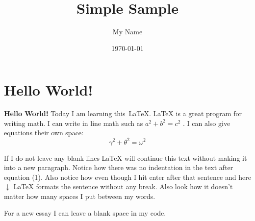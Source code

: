 \documentclass{article} %
\title{Simple Sample} %
\author{My Name} %
\date{\today} %
\begin{document}
\maketitle %

\section{Hello World!} %

\textbf{Hello World!} Today I am learning this~\LaTeX. %
\LaTeX{} is a great program for writing math. I can write in line math such as $a^2+b^2=c^2$ %
. I can also give equations their own space:
\begin{equation} %
  \gamma^2+\theta^2=\omega^2
\end{equation}

If I do not leave any blank lines \LaTeX{} will continue  this text without making it into a new paragraph.  Notice how there was no indentation in the text after equation (1).
Also notice how even though I hit enter after that sentence and here $\downarrow$
\LaTeX{} formats the sentence without any break.  Also   look  how      it   doesn't     matter          how    many  spaces     I put     between       my    words.

For a new essay I can leave a blank space in my code.
\end{document}
